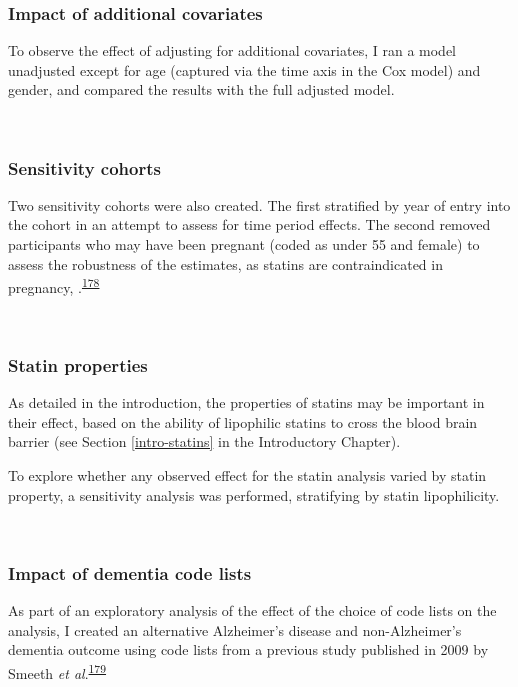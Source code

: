 \documentclass[a4paper, twoside]{templates/ociamthesis}
\begin{document}
\hypertarget{impact-of-additional-covariates}{%
\subsubsection{Impact of additional covariates}\label{impact-of-additional-covariates}}

To observe the effect of adjusting for additional covariates, I ran a model unadjusted except for age (captured via the time axis in the Cox model) and gender, and compared the results with the full adjusted model.

~

\hypertarget{sensitivity-cohorts}{%
\subsubsection{Sensitivity cohorts}\label{sensitivity-cohorts}}

Two sensitivity cohorts were also created. The first stratified by year of entry into the cohort in an attempt to assess for time period effects. The second removed participants who may have been pregnant (coded as under 55 and female) to assess the robustness of the estimates, as statins are contraindicated in pregnancy, .\textsuperscript{\protect\hyperlink{ref-karalis2016}{178}}

~

\hypertarget{statin-properties}{%
\subsubsection{Statin properties}\label{statin-properties}}

As detailed in the introduction, the properties of statins may be important in their effect, based on the ability of lipophilic statins to cross the blood brain barrier (see Section \ref{intro-statins} in the Introductory Chapter).

To explore whether any observed effect for the statin analysis varied by statin property, a sensitivity analysis was performed, stratifying by statin lipophilicity.

~

\hypertarget{impact-of-dementia-code-lists}{%
\subsubsection{Impact of dementia code lists}\label{impact-of-dementia-code-lists}}

As part of an exploratory analysis of the effect of the choice of code lists on the analysis, I created an alternative Alzheimer's disease and non-Alzheimer's dementia outcome using code lists from a previous study published in 2009 by Smeeth \emph{et al}.\textsuperscript{\protect\hyperlink{ref-smeeth2009}{179}}
\end{document}
